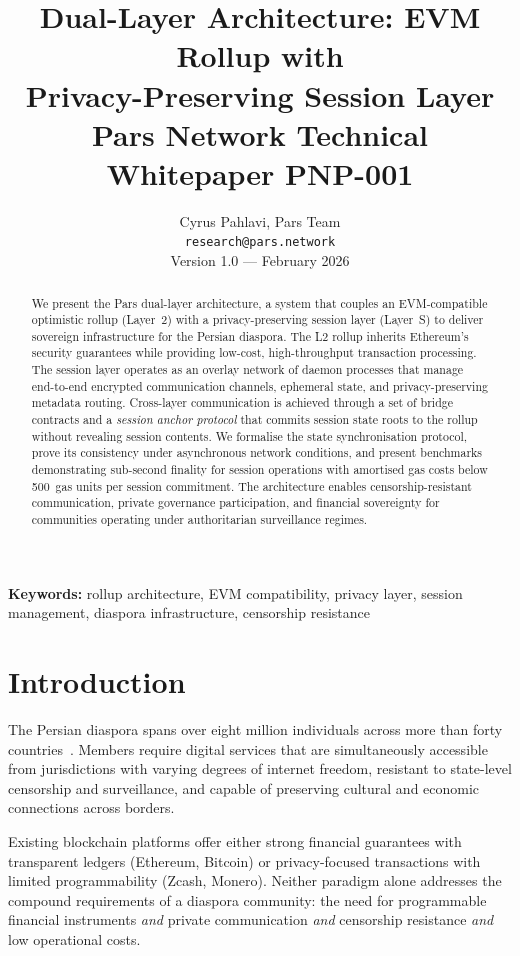 \documentclass[11pt,a4paper]{article}
\title{%
    \textbf{Dual-Layer Architecture: EVM Rollup with\\
    Privacy-Preserving Session Layer}\\[0.5em]
    \large Pars Network Technical Whitepaper PNP-001
}
\author{%
    Cyrus Pahlavi, Pars Team\\
    \texttt{research@pars.network}\\[0.5em]
    \small Version 1.0 --- February 2026
}
\date{}
\begin{document}
\parscoverpage

\thispagestyle{fancy}

\begin{abstract}
\noindent
We present the Pars dual-layer architecture, a system that couples an
EVM-compatible optimistic rollup (Layer~2) with a privacy-preserving session
layer (Layer~S) to deliver sovereign infrastructure for the Persian diaspora.
The L2 rollup inherits Ethereum's security guarantees while providing
low-cost, high-throughput transaction processing.  The session layer
operates as an overlay network of daemon processes that manage end-to-end
encrypted communication channels, ephemeral state, and privacy-preserving
metadata routing.  Cross-layer communication is achieved through a set of
bridge contracts and a \emph{session anchor protocol} that commits session
state roots to the rollup without revealing session contents.  We formalise
the state synchronisation protocol, prove its consistency under asynchronous
network conditions, and present benchmarks demonstrating sub-second finality
for session operations with amortised gas costs below 500~gas units per
session commitment.  The architecture enables censorship-resistant
communication, private governance participation, and financial sovereignty
for communities operating under authoritarian surveillance regimes.
\end{abstract}

\vspace{1em}
\noindent\textbf{Keywords:} rollup architecture, EVM compatibility, privacy
layer, session management, diaspora infrastructure, censorship resistance

\tableofcontents
\newpage

\section{Introduction}
\label{sec:introduction}

The Persian diaspora spans over eight million individuals across more than
forty countries~\cite{amanat2012persian}.  Members require digital services
that are simultaneously accessible from jurisdictions with varying degrees
of internet freedom, resistant to state-level censorship and surveillance,
and capable of preserving cultural and economic connections across borders.

Existing blockchain platforms offer either strong financial guarantees with
transparent ledgers (Ethereum, Bitcoin) or privacy-focused transactions with
limited programmability (Zcash, Monero).  Neither paradigm alone addresses
the compound requirements of a diaspora community: the need for programmable
financial instruments \emph{and} private communication \emph{and} censorship
resistance \emph{and} low operational costs.
\end{document}
